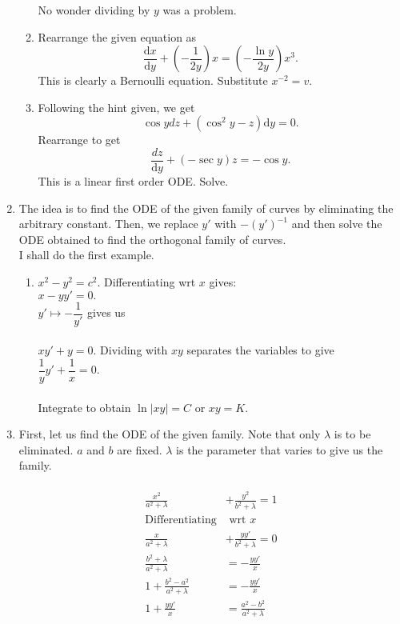 \documentclass[12pt]{article}
\theoremstyle{definition}
\numberwithin{thm}{section}
\newcommand{\dd}{{\mathrm d}}
\begin{document}
\begin{enumerate}[leftmargin=*, label = Q.\arabic*.]
\begin{enumerate}[label = (\roman*)]
		No wonder dividing by $y$ was a problem.
		\item Rearrange the given equation as
		\[\frac{\dd x}{\dd y} +  \left(-\frac{1}{2y}\right)x = \left(-\frac{\ln y}{2y}\right)x^3.\]
		This is clearly a Bernoulli equation. Substitute $x^{-2} = v.$
		\item Following the hint given, we get
		\[\cos ydz + (\cos^2y - z)\dd y = 0.\]
		Rearrange to get
		\[\frac{dz}{\dd y} + \left(-\sec y\right)z = -\cos y.\]
		This is a linear first order ODE. Solve.
	\end{enumerate}
	\item The idea is to find the ODE of the given family of curves by eliminating the arbitrary constant. Then, we replace $y'$ with $-(y')^{-1}$ and then solve the ODE obtained to find the orthogonal family of curves.\\
	I shall do the first example.
	\begin{enumerate}[label = (\roman*)] 
		\item $x^2 - y^2 = c^2.$ Differentiating wrt $x$ gives:\\
		$x - yy' = 0.$\\
		$y' \mapsto -\dfrac{1}{y'}$ gives us\\~\\
		$xy' + y = 0.$ Dividing with $xy$ separates the variables to give\\
		$\dfrac{1}{y}y' + \dfrac{1}{x} = 0.$\\~\\
		Integrate to obtain $\ln|xy| = C$ or $xy = K.$
	\end{enumerate}
	\item First, let us find the ODE of the given family. Note that only $\lambda$ is to be eliminated. $a$ and $b$ are fixed. $\lambda$ is the parameter that varies to give us the family.\\~\\
	\begin{align*} 
		\frac{x^2}{a^2 + \lambda} & + \frac{y^2}{b^2 + \lambda} = 1\\
		\text{Differentiating} & \text{ wrt } x\\
		\frac{x}{a^2 + \lambda} & + \frac{yy'}{b^2 + \lambda} = 0\\
		\frac{b^2 + \lambda}{a^2 + \lambda} & = -\frac{yy'}{x}\\
		1 + \frac{b^2 - a^2}{a^2 + \lambda} & = -\frac{yy'}{x}\\
		1 + \frac{yy'}{x} & = \frac{a^2 - b^2}{a^2 + \lambda}\\

\end{align*}
\end{enumerate}
\end{document}
